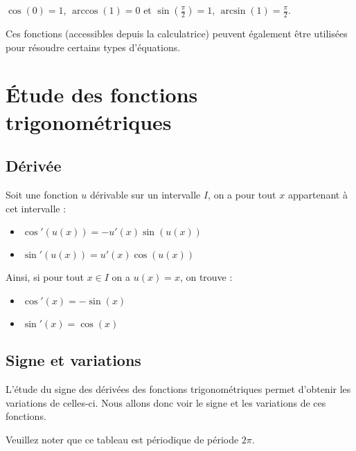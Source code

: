	\begin{tip}[Exemple]
		$\cos(0) = 1$, $\arccos(1) = 0$ et $\sin(\frac{\pi}{2}) = 1$, $\arcsin(1) = \frac{\pi}{2}$.
	\end{tip}

	Ces fonctions (accessibles depuis la calculatrice) peuvent également être utilisées pour résoudre certains types d'équations.

	\section{Étude des fonctions trigonométriques}

	\subsection{Dérivée}

	\begin{formula}
		Soit une fonction $u$ dérivable sur un intervalle $I$, on a pour tout $x$ appartenant à cet intervalle :
		\begin{itemize}
			\item $\cos'(u(x)) = -u'(x)\sin(u(x))$
			\item $\sin'(u(x)) = u'(x)\cos(u(x))$
		\end{itemize}
	\end{formula}

	\begin{formula}[Dérivée]
		Ainsi, si pour tout $x \in I$ on a $u(x) = x$, on trouve :
		\begin{itemize}
			\item $\cos'(x) = -\sin(x)$
			\item $\sin'(x) = \cos(x)$
		\end{itemize}
	\end{formula}

	\subsection{Signe et variations}

	L'étude du signe des dérivées des fonctions trigonométriques permet d'obtenir les variations de celles-ci. Nous allons donc voir le signe et les variations de ces fonctions.

	\begin{formula}
		\contentwidth[big]

		Veuillez noter que ce tableau est périodique de période $2\pi$.
	\end{formula}

